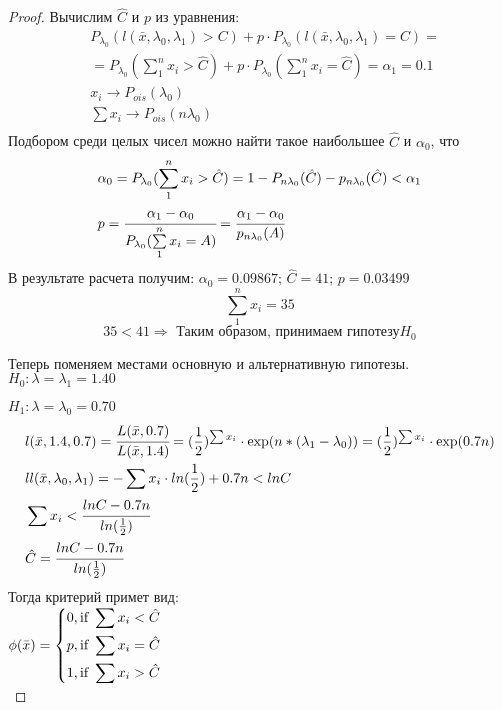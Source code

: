 \begin{proof}
	Вычислим $\hat{C}$ и $p$ из уравнения:		
	\begin{align}
		& P_{\lambda_0}(l(\bar x, \lambda_0, \lambda_1)>C)+p\cdot P_{\lambda_0}(l(\bar x, \lambda_0, \lambda_1)=C)= \\
		& = P_{\lambda_0}(\sum\limits_1^nx_i>\hat{C})+p\cdot P_{\lambda_0}(\sum\limits_1^nx_i=\hat{C})=\alpha_1=0.1 \\
		& x_i \rightarrow P_{ois}(\lambda_0) \\
		& \sum x_i \rightarrow P_{ois}(n\lambda_0) \\
	\end{align} 
	Подбором среди целых чисел можно найти такое наибольшее $\hat{C}$ и $\alpha_0$, что
	\begin{align}
		& \alpha_0=P_{\lambda_0}(\sum\limits_1^nx_i>\hat{C})=1-P_{n\lambda_0}(\hat{C})-p_{n\lambda_0}(\hat{C})<\alpha_1 \\
		& p=\cfrac{\alpha_1-\alpha_0}{P_{\lambda_0}(\sum\limits_1^nx_i=A)}=\cfrac{\alpha_1-\alpha_0}{p_{n\lambda_0}(A)} \\
	\end{align}
	В результате расчета получим: $\alpha_0=0.09867$; $\hat{C}=41$; $p=0.03499$
	\begin{equation}
		\sum\limits_1^nx_i=35
	\end{equation}
	\begin{equation}
		35<41\Rightarrow\text{ Таким образом, принимаем гипотезу} H_0 
	\end{equation}

	Теперь поменяем местами основную и альтернативную гипотезы.	\\
	
	$H_0:\lambda=\lambda_1=1.40$ 
	
	$H_1:\lambda=\lambda_0=0.70$ 
	\begin{align}
		& l(\bar x, 1.4, 0.7)=\cfrac{L(\bar x, 0.7)}{L(\bar x, 1.4)}=(\frac12)^{\sum x_i}\cdot \exp(n*(\lambda_1-\lambda_0))=(\frac12)^{\sum x_i}\cdot \exp(0.7n) \\
		& ll(\bar x, \lambda_0, \lambda_1)=-\sum x_i\cdot ln(\frac12)+0.7n<lnC \\ 
		& \sum x_i < \cfrac{lnC-0.7n}{ln(\frac12)} \\
		& \hat{C}=\cfrac{lnC-0.7n}{ln(\frac12)} \\
	\end{align}
	Тогда критерий примет вид: \\
	
	$\phi(\bar x)=\left\{
	\begin{gathered}
		0, \text{if } \sum x_i<\hat{C} \hfill \\
		p, \text{if } \sum x_i=\hat{C} \hfill \\
		1, \text{if } \sum x_i>\hat{C} \hfill \\ 
	\end{gathered}
	\right.$	\\
	

\end{proof}
